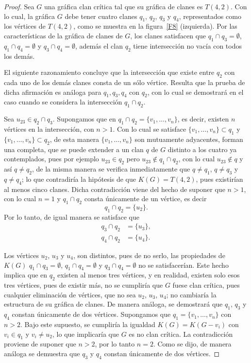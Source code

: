 \documentclass[12pt]{book}
\theoremstyle{definition}
\begin{document}
\begin{proof}
Sea $G$ una gráfica clan crítica tal que su gráfica de clanes es $T(4,2)$. Con lo cual, la gráfica $G$ debe tener cuatro clanes $q_1$, $q_2$, $q_3$ y $q_4$, representados como los vértices de $T(4,2)$, como se muestra en la figura~\ref{F8} (izquierda). Por las características de la gráfica de clanes de $G$, los clanes satisfacen que $q_1\cap q_3=\emptyset$, $q_1\cap q_4=\emptyset$ y $q_3\cap q_4=\emptyset$, además el clan $q_2$ tiene intersección no vacía con todos los demás.

El siguiente razonamiento concluye que la intersección que existe entre $q_2$ con cada uno de los demás clanes consta de un sólo vértice. Resulta que la prueba de dicha afirmación es análoga para $q_1,q_3,q_4$ con $q_2$, con lo cual se demostrará en el caso cuando se considera la intersección $q_1\cap q_2$.

Sea $u_{23}\in q_2\cap q_3$. Supongamos que en $q_1\cap q_2=\{v_1, \dots ,v_n\}$, es decir, existen $n$ vértices en la intersección, con $n>1$. Con lo cual se satisface $\{v_1, \dots ,v_n\}\subset q_1$ y $\{v_1, \dots ,v_n\}\subset q_2$, de esta manera $\{v_1, \dots ,v_n\}$ son mutuamente adyacentes, forman una completa, que se puede extender a un clan $q$ de $G$ distinto a los cuatro ya contemplados, pues por ejemplo $u_{23}\in q_2$ pero $u_{23}\notin q_1\cap q_2$, con lo cual $u_{23}\notin q$ y así $q\neq q_2$, de la misma manera se verifica inmediatamente que $q\neq q_1$, $q\neq q_3$ y $q\neq q_4$; lo que contradiría la hipótesis de que $K(G)=T(4,2)$, pues existirían al menos cinco clanes. Dicha contradicción viene del hecho de suponer que $n>1$, con lo cual $n=1$ y $q_1\cap q_2$ consta únicamente de un vértice, es decir
\begin{equation*}
q_1\cap q_2= \{u_2\}.
\end{equation*}
Por lo tanto, de igual manera se satisface que 
\begin{equation*}
\begin{aligned}
q_3\cap q_2 &= \{u_3\}, \\
q_4\cap q_2 &= \{u_4\}.
\end{aligned}
\end{equation*}

Los vértices $u_2$, $u_3$ y $u_4$, son distintos, pues de no serlo, las propiedades de $K(G)$ $q_1\cap q_3=\emptyset$, $q_1\cap q_4=\emptyset$ y $q_3\cap q_4=\emptyset$ no se satisfacerían. Este hecho implica que en $q_2$ existen al menos tres vértices, y en realidad, existen solo esos tres vértices, pues de existir más, no se cumpliría que $G$ fuese clan crítica, pues cualquier eliminación de vértices, que no sea $u_2$, $u_3$, $u_4$; no cambiaría la estructura de su gráfica de clanes.
De manera análoga, se demostrará que $q_1$, $q_3$ y $q_4$ constan únicamente de dos vértices. Supongamos que $q_1=\{v_1, \dots ,v_n\}$ con $n>2$. Bajo este supuesto, se cumpliría la igualdad $K(G)=K(G-v_i)$ con $v_i\in q_1$ y $v_i\neq u_2$, lo que implicaría que $G$ es no clan crítica. La contradicción proviene de suponer que $n>2$, por lo tanto $n=2$. Como se dijo, de manera análoga se demuestra que $q_3$ y $q_4$ constan únicamente de dos vértices.


\end{proof}
\end{document}
